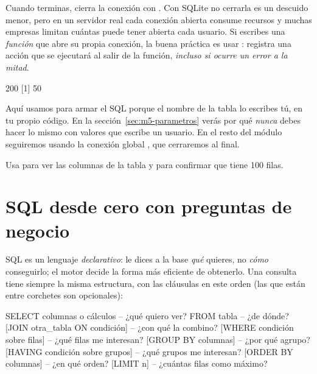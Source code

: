 Cuando terminas, cierra la conexión con . Con
SQLite no cerrarla es un descuido menor, pero en un servidor real cada
conexión abierta consume recursos y muchas empresas limitan cuántas puede
tener abierta cada usuario. Si escribes una \emph{función} que abre su
propia conexión, la buena práctica es usar : registra una
acción que se ejecutará al salir de la función, \emph{incluso si ocurre un
error a la mitad}.


\begin{rsalida}
[1] 200
[1] 50
\end{rsalida}

Aquí usamos  para armar el SQL porque el nombre de la tabla
lo escribes tú, en tu propio código. En la sección~\ref{sec:m5-parametros}
verás por qué \emph{nunca} debes hacer lo mismo con valores que escribe un
usuario. En el resto del módulo seguiremos usando la conexión global
, que cerraremos al final.

\begin{hazlotu}
Usa  para ver las columnas de la tabla
 y  para confirmar que tiene 100
filas.
\end{hazlotu}

\section{SQL desde cero con preguntas de negocio}
\label{sec:m5-sql}

SQL es un lenguaje \emph{declarativo}: le dices a la base \emph{qué} quieres,
no \emph{cómo} conseguirlo; el motor decide la forma más eficiente de
obtenerlo. Una consulta tiene siempre la misma estructura, con las
cláusulas en este orden (las que están entre corchetes son opcionales):

\begin{sqlcode}
SELECT   columnas o cálculos          -- ¿qué quiero ver?
FROM     tabla                        -- ¿de dónde?
[JOIN    otra_tabla ON condición]     -- ¿con qué la combino?
[WHERE   condición sobre filas]       -- ¿qué filas me interesan?
[GROUP BY columnas]                   -- ¿por qué agrupo?
[HAVING  condición sobre grupos]      -- ¿qué grupos me interesan?
[ORDER BY columnas]                   -- ¿en qué orden?
[LIMIT   n]                           -- ¿cuántas filas como máximo?
\end{sqlcode}

